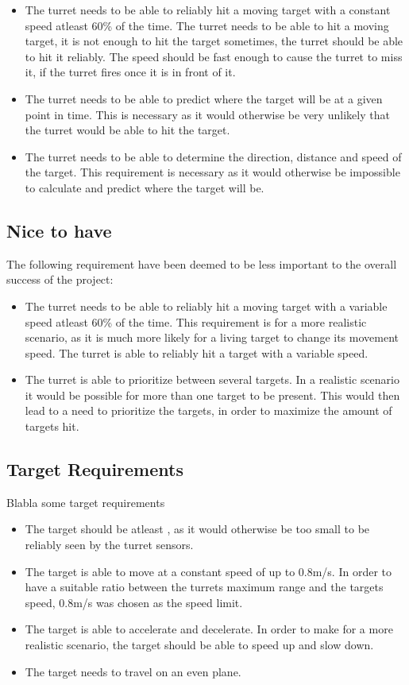 \begin{itemize}
  \item The turret needs to be able to reliably hit a moving target with a
  constant speed atleast 60\% of the time. The turret needs to be able to hit a
  moving target, it is not enough to hit the target sometimes, the turret should
  be able to hit it reliably. The speed should be fast enough to cause the
  turret to miss it, if the turret fires once it is in front of it.  
  \item The turret needs to be able to predict where the target will be at a given point
in time. This is necessary as it would otherwise be very unlikely that the
turret would be able to hit the target.
  \item The turret needs to be able to determine the direction, distance and speed of
the target. This requirement is necessary as it would otherwise be impossible to
calculate and predict where the target will be.
\end{itemize}

\subsection{Nice to have}
The following requirement have been deemed to be less important to the overall
success of the project:
\begin{itemize}
  \item The turret needs to be able to reliably hit a moving target with a
variable speed atleast 60\% of the time. This requirement is for a
more realistic scenario, as it is much more likely for a living target to
change its movement speed. The turret is able to reliably hit a target with a
variable speed.
  \item The turret is able to prioritize between several targets. In a realistic
scenario it would be possible for more than one target to be present. This would
then lead to a need to prioritize the targets, in order to maximize the
amount of targets hit.
\end{itemize}

\subsection{Target Requirements}
Blabla some target requirements

\begin{itemize}
  \item The target should be atleast , as it
would otherwise be too small to be reliably seen by the turret sensors.
  \item The target is able to move at a constant speed of up to 0.8m/s. In order to
have a suitable ratio between the turrets maximum range and the targets
speed, 0.8m/s was chosen as the speed limit.
  \item The target is able to accelerate and decelerate. In order to make for a
  more realistic scenario, the target should be able to speed up and slow down.
  \item The target needs to travel on an even plane.
\end{itemize}


